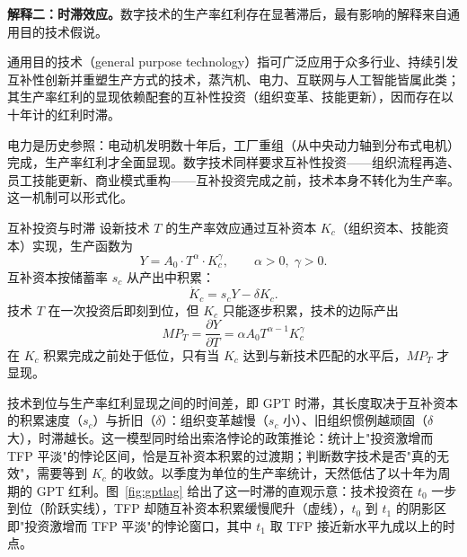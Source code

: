\textbf{解释二：时滞效应。}数字技术的生产率红利存在显著滞后，最有影响的解释来自通用目的技术假说。

\begin{definition}
通用目的技术（general purpose technology）指可广泛应用于众多行业、持续引发互补性创新并重塑生产方式的技术，蒸汽机、电力、互联网与人工智能皆属此类；其生产率红利的显现依赖配套的互补性投资（组织变革、技能更新），因而存在以十年计的红利时滞。
\end{definition}

电力是历史参照：电动机发明数十年后，工厂重组（从中央动力轴到分布式电机）完成，生产率红利才全面显现。数字技术同样要求互补性投资——组织流程再造、员工技能更新、商业模式重构——互补投资完成之前，技术本身不转化为生产率。这一机制可以形式化。

\begin{derivation}{互补投资与时滞}{}
设新技术 $T$ 的生产率效应通过互补资本 $K_c$（组织资本、技能资本）实现，生产函数为
\[
Y = A_0 \cdot T^{\alpha} \cdot K_c^{\gamma}, \qquad \alpha > 0,\; \gamma > 0.
\]
互补资本按储蓄率 $s_c$ 从产出中积累：
\[
\dot K_c = s_c Y - \delta K_c.
\]
技术 $T$ 在一次投资后即刻到位，但 $K_c$ 只能逐步积累，技术的边际产出
\[
MP_T = \frac{\partial Y}{\partial T} = \alpha A_0 T^{\alpha-1} K_c^{\gamma}
\]
在 $K_c$ 积累完成之前处于低位，只有当 $K_c$ 达到与新技术匹配的水平后，$MP_T$ 才显现。
\end{derivation}

技术到位与生产率红利显现之间的时间差，即 GPT 时滞，其长度取决于互补资本的积累速度（$s_c$）与折旧（$\delta$）：组织变革越慢（$s_c$ 小）、旧组织惯例越顽固（$\delta$ 大），时滞越长。这一模型同时给出索洛悖论的政策推论：统计上"投资激增而 TFP 平淡"的悖论区间，恰是互补资本积累的过渡期；判断数字技术是否"真的无效"，需要等到 $K_c$ 的收敛。以季度为单位的生产率统计，天然低估了以十年为周期的 GPT 红利。图~\ref{fig:gptlag} 给出了这一时滞的直观示意：技术投资在 $t_0$ 一步到位（阶跃实线），TFP 却随互补资本积累缓慢爬升（虚线），$t_0$ 到 $t_1$ 的阴影区即"投资激增而 TFP 平淡"的悖论窗口，其中 $t_1$ 取 TFP 接近新水平九成以上的时点。

